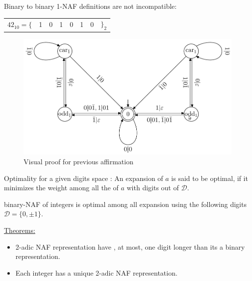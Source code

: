 \begin{itemize}
			Binary to binary 1-NAF definitions are not incompatible:
			\begin{center}
				\begin{tabularx}{10cm}
{p{1.5cm}p{0.35cm}p{0.35cm}p{0.35cm}p{0.35cm}p{0.35cm}p{0.35cm}p{0.75cm}}
$ 42_{10} = \{$  &  1  &   0 &  1  &  0  &  1  &  0  &  $\}_2$\\	
				\end{tabularx}
			\end{center}


    \begin{figure}[!h]
        \centering
        \includegraphics[width=15cm]{images/RtoL_allsignedbinary_to_2na0f.png}
		\caption{Visual proof for previous affirmation}
    \end{figure}

    \begin{mydef}{Optimality for a given digits space} :			
			An expansion of $a$  is said to be optimal, if it minimizes the weight
			among all the of $a$ with digits out of $\mathcal{D}$.\\
	\end{mydef}
		
	\begin{mythm}[Reitwiesner' 1960] 
			binary-NAF of integers is optimal among all expansion
			using the following digits $\mathcal{D} =\{ 0,\pm 1\}$.				
	\end{mythm}
			
		\underline{Theorems:} 
\begin{itemize}
\item 2-adic NAF representation have , at most, one digit longer than its a binary representation.
\item Each integer has a unique 2-adic NAF representation.
\end{itemize}


\end{itemize}
